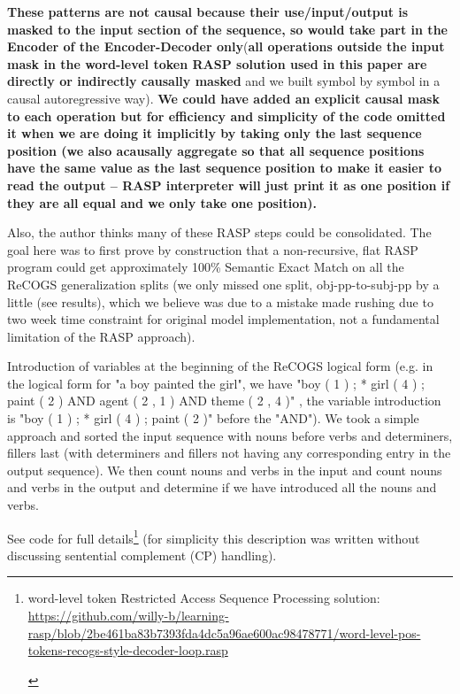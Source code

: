 \documentclass[11pt]{article}
\begin{document}
\textbf{These patterns are not causal because their use/input/output is masked to the input section of the sequence, so would take part in the Encoder of the Encoder-Decoder only}(\textbf{all operations outside the input mask in the word-level token RASP solution used in this paper are directly or indirectly causally masked} and we built symbol by symbol in a causal autoregressive way). \textbf{We could have added an explicit causal mask to each operation but for efficiency and simplicity of the code omitted it when we are doing it implicitly by taking only the last sequence position (we also acausally aggregate so that all sequence positions have the same value as the last sequence position to make it easier to read the output -- RASP interpreter will just print it as one position if they are all equal and we only take one position).}

Also, the author thinks many of these RASP steps could be consolidated. The goal here was to first prove by construction that a non-recursive, flat RASP program could get approximately 100\% Semantic Exact Match on all the ReCOGS generalization splits (we only missed one split, obj-pp-to-subj-pp by a little (see results), which we believe was due to a mistake made rushing due to two week time constraint for original model implementation, not a fundamental limitation of the RASP approach).

Introduction of variables at the beginning of the ReCOGS logical form (e.g. in the logical form for "a boy painted the girl", we have "boy ( 1 ) ; * girl ( 4 ) ; paint ( 2 ) AND agent ( 2 , 1 ) AND theme ( 2 , 4 )" , the variable introduction is "boy ( 1 ) ; * girl ( 4 ) ; paint ( 2 )" before the "AND"). We took a simple approach and sorted the input sequence with nouns before verbs and determiners, fillers last (with determiners and fillers not having any corresponding entry in the output sequence). We then count nouns and verbs in the input and count nouns and verbs in the output and determine if we have introduced all the nouns and verbs.

See code for full details\footnote{\begin{footnotesize}word-level token Restricted Access Sequence Processing solution: \href{https://github.com/willy-b/learning-rasp/blob/2be461ba83b7393fda4dc5a96ae600ac98478771/word-level-pos-tokens-recogs-style-decoder-loop.rasp}{https://github.com/willy-b/learning-rasp/blob/2be461ba83b7393fda4dc5a96ae600ac98478771/word-level-pos-tokens-recogs-style-decoder-loop.rasp} \end{footnotesize}} (for simplicity this description was written without discussing sentential complement (CP) handling).
\end{document}
